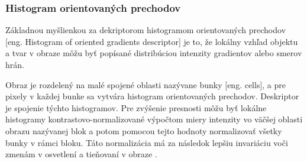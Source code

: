 \subsubsection{Histogram orientovaných prechodov}
Základnou myšlienkou za dekriptorom histogramom orientovaných prechodov [eng. Histogram of oriented gradients descriptor] je to, že lokálny vzhľad objektu a tvar v obraze môžu byť popísané
	distribúciou intenzity gradientov alebo smerov hrán.

Obraz je rozdelený na malé spojené oblasti nazývane bunky [eng. cells], a pre pixely v každej bunke sa vytvára histogram orientovaných prechodov.
Deskriptor je spojenie týchto histogramov.
Pre zvýšenie presnosti môžu byť lokálne histogramy kontrastovo-normalizované výpočtom miery intenzity vo väčšej oblasti obrazu nazývanej blok a potom
	pomocou tejto hodnoty normalizovať všetky bunky v rámci bloku.
Táto normalizácia má za následok lepšiu invariáciu voči zmenám v osvetlení a tieňovaní v obraze \cite{prop:HOG}.

\begin{comment}
	\subsubsection{Priemerna štandartná odchylka vstupných údajov}
	Je užitočné vytvoriť si tzv. ''stredný obraz'' získaný priemernými hodnotami pre každý pixel zo všetkých trénovacích dát.
	Timto spôsobom je možné vytvoriť si základny prehľad o štruktúre vstupných dát.
	Na základe toho môžeme potom do vstupným dát pridať rôzne dalšie variácie klasifikovaných objektov pre lepšie generalizovanie klasifikátora \cite{odkaz:NNPreprocessing}.
\end{comment}
